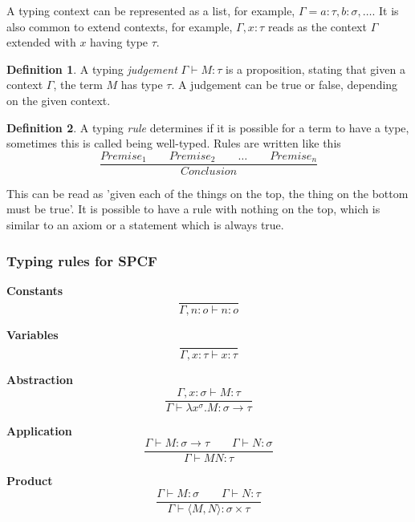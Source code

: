 \documentclass[12pt,a4paper]{report}
\theoremstyle{definition}
\theoremstyle{definition}
\newtheorem{definition}{Definition}[chapter]%
\theoremstyle{remark}
\begin{document}
A typing context can be represented as a list, for example, $\Gamma = a:\tau, b:\sigma, \ldots$. It is also common to extend contexts, for example, $\Gamma, x:\tau$ reads as the context $\Gamma$ extended with $x$ having type $\tau$. 

\begin{definition}
    A typing \emph{judgement} $\Gamma \vdash M:\tau$ is a proposition, stating that given a context $\Gamma$, the term $M$ has type $\tau$. A judgement can be true or false, depending on the given context.
\end{definition}

\begin{definition}
    A typing \emph{rule} determines if it is possible for a term to have a type, sometimes this is called being well-typed. Rules are written like this
    \[
    \frac{Premise_1 \quad\quad Premise_2 \quad\quad \ldots \quad\quad Premise_n}{Conclusion}
    \]

    This can be read as 'given each of the things on the top, the thing on the bottom must be true'. It is possible to have a rule with nothing on the top, which is similar to an axiom or a statement which is always true.
\end{definition}

\subsubsection{Typing rules for SPCF} \label{section: type rules}

\textbf{Constants}
\begin{equation}
    \frac{}{\Gamma, n:o \vdash n:o}
\end{equation}

\textbf{Variables}
\begin{equation}
    \frac{}{\Gamma, x:\tau \vdash x: \tau}
\end{equation}

\textbf{Abstraction}
\begin{equation}
    \frac{\Gamma, x:\sigma \vdash M : \tau}{\Gamma \vdash \lambda x^{\sigma}. M : \sigma \rightarrow \tau}
\end{equation}

\textbf{Application}
\begin{equation}
    \frac{\Gamma \vdash M : \sigma \rightarrow \tau \quad\quad \Gamma \vdash N : \sigma}{\Gamma \vdash MN : \tau}
\end{equation}

\textbf{Product}
\begin{equation}
    \frac{\Gamma \vdash M:\sigma \quad\quad \Gamma \vdash N:\tau}{\Gamma \vdash \langle M,N \rangle : \sigma \times \tau}
\end{equation}
\end{document}
